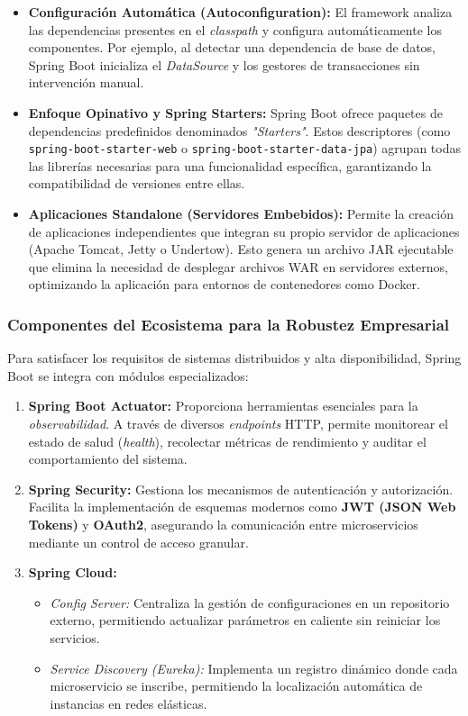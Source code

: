 \begin{itemize}
    \item \textbf{Configuración Automática (Autoconfiguration):} El framework analiza las dependencias presentes en el \textit{classpath} y configura automáticamente los componentes. Por ejemplo, al detectar una dependencia de base de datos, Spring Boot inicializa el \textit{DataSource} y los gestores de transacciones sin intervención manual.
    \item \textbf{Enfoque Opinativo y Spring Starters:} Spring Boot ofrece paquetes de dependencias predefinidos denominados \textit{"Starters"}. Estos descriptores (como \texttt{spring-boot-starter-web} o \texttt{spring-boot-starter-data-jpa}) agrupan todas las librerías necesarias para una funcionalidad específica, garantizando la compatibilidad de versiones entre ellas.
    \item \textbf{Aplicaciones Standalone (Servidores Embebidos):} Permite la creación de aplicaciones independientes que integran su propio servidor de aplicaciones (Apache Tomcat, Jetty o Undertow). Esto genera un archivo JAR ejecutable que elimina la necesidad de desplegar archivos WAR en servidores externos, optimizando la aplicación para entornos de contenedores como Docker.
\end{itemize}

\subsubsection{Componentes del Ecosistema para la Robustez Empresarial}

Para satisfacer los requisitos de sistemas distribuidos y alta disponibilidad, Spring Boot se integra con módulos especializados:

\begin{enumerate}
    \item \textbf{Spring Boot Actuator:} Proporciona herramientas esenciales para la \textit{observabilidad}. A través de diversos \textit{endpoints} HTTP, permite monitorear el estado de salud (\textit{health}), recolectar métricas de rendimiento y auditar el comportamiento del sistema.
    \item \textbf{Spring Security:} Gestiona los mecanismos de autenticación y autorización. Facilita la implementación de esquemas modernos como \textbf{JWT (JSON Web Tokens)} y \textbf{OAuth2}, asegurando la comunicación entre microservicios mediante un control de acceso granular.
    \item \textbf{Spring Cloud:}
    \begin{itemize}
        \item \textit{Config Server:} Centraliza la gestión de configuraciones en un repositorio externo, permitiendo actualizar parámetros en caliente sin reiniciar los servicios.
        \item \textit{Service Discovery (Eureka):} Implementa un registro dinámico donde cada microservicio se inscribe, permitiendo la localización automática de instancias en redes elásticas.
    \end{itemize}
\end{enumerate}

